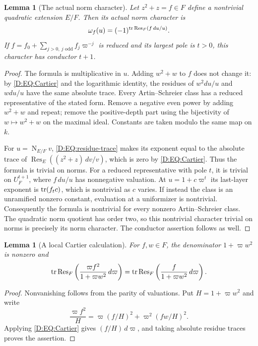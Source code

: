 \documentclass[11pt]{amsart}
\newtheorem{lemma}[theorem]{Lemma}
\theoremstyle{definition}
\theoremstyle{remark}
\newcommand{\Nm}{\operatorname{N}}
\newcommand{\Res}{\operatorname{Res}}
\begin{document}
\begin{lemma}[The actual norm character]\label{D:EQ:ASsymbol}
Let $z^2+z=f\in F$ define a nontrivial quadratic extension $E/F$.
Then its actual norm character is
\begin{equation}\label{D:EQ:symbol}
 \omega_f(u)=(-1)^{\tr\Res_F(f\,du/u)}.
\end{equation}
If $f=f_0+\sum_{j>0,\ j\text{ odd}}f_j\varpi^{-j}$ is reduced and
its largest pole is $t>0$, this character has conductor $t+1$.
\end{lemma}
\begin{proof}
The formula is multiplicative in $u$. Adding $w^2+w$ to $f$ does not
change it: by \eqref{D:EQ:Cartier} and the logarithmic identity, the residues
of $w^2du/u$ and $wdu/u$ have the same absolute trace.
Every Artin--Schreier class has a reduced representative of the stated
form. Remove a negative even power by adding $w^2+w$ and repeat; remove
the positive-depth part using the bijectivity of $w\mapsto w^2+w$ on
the maximal ideal. Constants are taken modulo the same map on $k$.

For $u=\Nm_{E/F}v$, \eqref{D:EQ:residue-trace} makes its exponent equal to
the absolute trace of
$\Res_E((z^2+z)\,dv/v)$, which is zero by \eqref{D:EQ:Cartier}.
Thus the formula is trivial on norms.
For a reduced representative with pole $t$, it is trivial on $U_F^{t+1}$,
where $f\,du/u$ has nonnegative valuation. At
$u=1+c\varpi^t$ its last-layer exponent is $\operatorname{tr}(f_tc)$, which is
nontrivial as $c$ varies. If instead the class is an unramified nonzero
constant, evaluation at a uniformizer is nontrivial.
Consequently the formula is nontrivial for every nonzero
Artin--Schreier class. The quadratic norm quotient has order two, so
this nontrivial character trivial on norms is precisely its norm
character. The conductor assertion follows as well.
\end{proof}

\begin{lemma}[A local Cartier calculation]\label{D:EQ:rationalCartier}
For $f,w\in F$, the denominator $1+\varpi w^2$ is nonzero and
\begin{equation}\label{D:EQ:Cartier-rational}
 \tr\Res_F\left(\frac{\varpi f^2}{1+\varpi w^2}\,d\varpi\right)
 =\tr\Res_F\left(\frac{f}{1+\varpi w^2}\,d\varpi\right).
\end{equation}
\end{lemma}
\begin{proof}
Nonvanishing follows from the parity of valuations. Put
$H=1+\varpi w^2$ and write
\[
 \frac{\varpi f^2}{H}
   =\varpi(f/H)^2+\varpi^2(fw/H)^2.
\]
Applying \eqref{D:EQ:Cartier} gives $(f/H)\,d\varpi$, and taking absolute
residue traces proves the assertion.
\end{proof}
\end{document}
